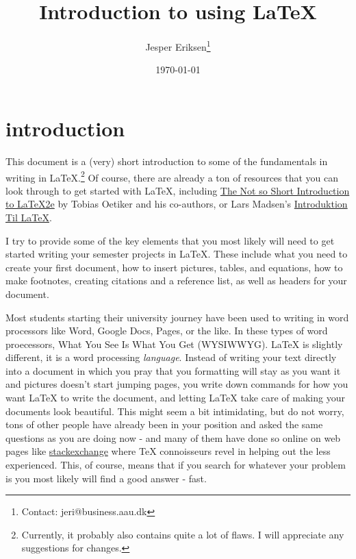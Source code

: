 \documentclass[10pt]{article}
\title{Introduction to using \LaTeX}
\author{Jesper Eriksen\footnote{Contact: jeri@business.aau.dk}}
\date{\today}
\begin{document}
\maketitle 


\tableofcontents

\newpage
\section{introduction}

This document is a (very) short introduction to some of the fundamentals in writing in LaTeX.\footnote{Currently, it probably also contains quite a lot of flaws. I will appreciate any suggestions for changes.} Of course, there are already a ton of resources that you can look through to get started with \LaTeX, including \href{https://tobi.oetiker.ch/lshort/lshort.pdf}{The Not so Short Introduction to LaTeX2e} by Tobias Oetiker and his co-authors, or Lars Madsen's \href{https://data.math.au.dk/system/latex/bog/version3/beta/ltxb-2011-09-13-20-10.pdf}{Introduktion Til \LaTeX}. 

I try to provide some of the key elements that you most likely will need to get started writing your semester projects in LaTeX. These include what you need to create your first document, how to insert pictures, tables, and equations, how to make footnotes, creating citations and a reference list, as well as headers for your document. 

Most students starting their university journey have been used to writing in word processors like Word, Google Docs, Pages, or the like. In these types of word proecessors, What You See Is What You Get (WYSIWWYG). LaTeX is slightly different, it is a word processing \textit{language}. Instead of writing your text directly into a document in which you pray that you formatting will stay as you want it and pictures doesn't start jumping pages, you write down commands for how you want LaTeX to write the document, and letting LaTeX take care of making your documents look beautiful. This might seem a bit intimidating, but do not worry, tons of other people have already been in your position and asked the same questions as you are doing now - and many of them have done so online on web pages like \href{https://tex.stackexchange.com/}{stackexchange} where TeX connoisseurs revel in helping out the less experienced. This, of course, means that if you search for whatever your problem is you most likely will find a good answer - fast.   
\end{document}
